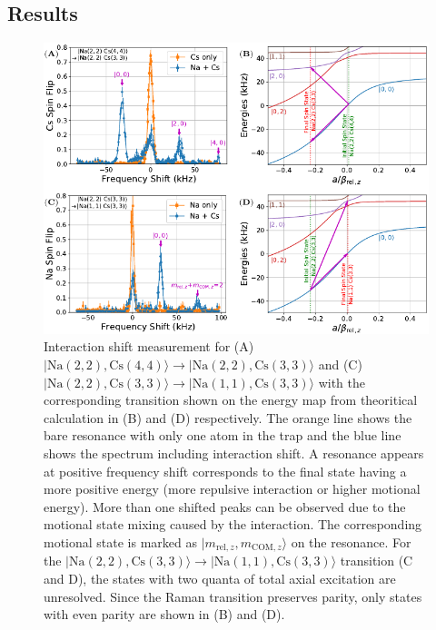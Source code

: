 \subsection{Results}
\label{ch:interaction-shift:spectroscopy:results}

\begin{figure}
  \centering
  \includegraphics[width=\textwidth]{figures/interaction_shift_results.pdf}
  \caption[Interaction shift measurement results.]{
    Interaction shift measurement for
    (A) $|\mathrm{Na(2, 2),Cs(4, 4)}\rangle\rightarrow|\mathrm{Na(2, 2),Cs(3, 3)}\rangle$
    and (C) $|\mathrm{Na(2, 2),Cs(3, 3)}\rangle\rightarrow|\mathrm{Na(1, 1),Cs(3, 3)}\rangle$
    with the corresponding transition shown on the energy map from theoritical calculation
    in (B) and (D) respectively.
    The orange line shows the bare resonance with only one atom in the trap
    and the blue line shows the spectrum including interaction shift.
    A resonance appears at positive frequency shift corresponds to the final state
    having a more positive energy (more repulsive interaction or higher motional energy).
    More than one shifted peaks can be observed due to the motional state mixing caused
    by the interaction. The corresponding motional state is marked as
    $|m_{\mathrm{rel},z},m_{\mathrm{COM},z}\rangle$ on the resonance.
    For the $|\mathrm{Na(2, 2),Cs(3, 3)}\rangle\rightarrow|\mathrm{Na(1, 1),Cs(3, 3)}\rangle$
    transition (C and D), the states with two quanta of total axial excitation are unresolved.
    Since the Raman transition preserves parity, only states with even parity are shown
    in (B) and (D).
    \label{fig:interaction-shift:results}}
\end{figure}

